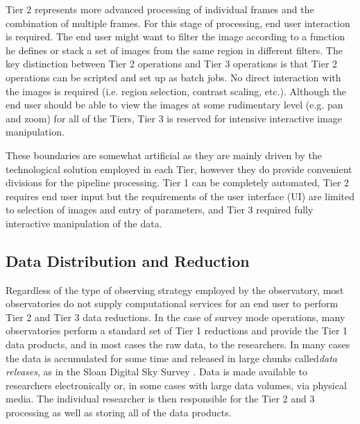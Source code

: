 \documentclass[10pt,conference]{IEEEtran}
\begin{document}
 Tier 2 represents more advanced processing of individual frames and the combination of multiple frames. For this stage of processing, end user interaction is required. The end user might want to filter the image according to a function he defines or stack a set of images from the same region in different filters. The key distinction between Tier 2 operations and Tier 3 operations is that Tier 2 operations can be scripted and set up as batch jobs. No direct interaction with the images is required (i.e. region selection, contrast scaling, etc.). Although the end user should be able to view the images at some rudimentary level (e.g. pan and zoom) for all of the Tiers, Tier 3 is reserved for intensive interactive image manipulation.

These boundaries are somewhat artificial as they are mainly driven by the technological solution employed in each Tier, however they do provide convenient divisions for the pipeline processing. Tier 1 can be completely automated, Tier 2 requires end user input but the requirements of the user interface (UI) are limited to selection of images and entry of parameters, and Tier 3 required fully interactive manipulation of the data. 

\subsection{Data Distribution and Reduction}\label{sec:reduction}

Regardless of the type of observing strategy employed by the observatory, most observatories do not supply computational services for an end user to perform Tier 2 and Tier 3 data reductions. In the case of survey mode operations, many observatories perform a standard set of Tier 1 reductions and provide the Tier 1 data products, and in most cases the raw data, to the researchers. In many cases the data is accumulated for some time and released in large chunks called{\it data releases}, as in the Sloan Digital Sky Survey \cite{york2000}. Data is made available to researchers electronically or, in some cases with large data volumes, via physical media. The individual researcher is then responsible for the Tier 2 and 3 processing as well as storing all of the data products.
\end{document}

